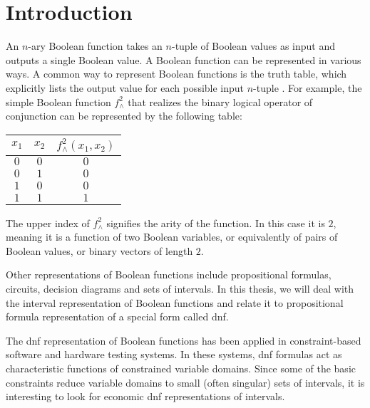 \chapter*{Introduction}

An $n$-ary Boolean function takes an $n$-tuple of Boolean values as input
and outputs a single Boolean value.
A Boolean function can be represented in various ways.
A common way to represent Boolean functions
is the truth table,
which explicitly lists the output value for each possible input $n$-tuple \citep[Definition 1.2]{Crama2011}.
For example,
the simple Boolean function $f^2_{\wedge}$ that realizes the binary logical operator of conjunction
can be represented by the following table:
\begin{center}
\begin{tabular}{cc|c}
$x_1$ & $x_2$ & $f^2_{\wedge}(x_1, x_2)$ \\
\hline
$0$ & $0$ & $0$ \\
$0$ & $1$ & $0$ \\
$1$ & $0$ & $0$ \\
$1$ & $1$ & $1$ \\
\end{tabular}
\end{center}

The upper index of $f^2_{\wedge}$
signifies the arity of the function.
In this case it is $2$,
meaning it is a function of two Boolean variables,
or equivalently of pairs of Boolean values,
or binary vectors of length $2$.

Other representations of Boolean functions
include
propositional formulas,
circuits,
decision diagrams
and sets of intervals.
In this thesis,
we will deal with the interval representation of Boolean functions
and relate it to propositional formula representation of a special form called \acrfull{dnf}.

The \acrshort{dnf} representation of Boolean functions
has been applied in constraint-based software
\citep{DeMillo1991} %
and hardware
\citep{Lewin1995} %
testing systems.
In these systems,
\acrshort{dnf} formulas act as characteristic functions
of constrained variable domains.
Since some of the basic constraints
reduce variable domains to small (often singular) sets of intervals,
it is interesting to look for economic \acrshort{dnf}
representations of intervals.

